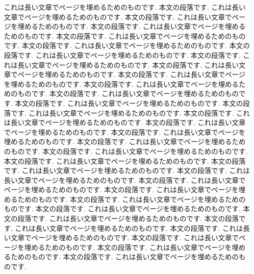\documentclass{jlreq}
\begin{document}
これは長い文章でページを埋めるためのものです. 本文の段落です. これは長い文章でページを埋めるためのものです. 本文の段落です. これは長い文章でページを埋めるためのものです. 本文の段落です. これは長い文章でページを埋めるためのものです. 本文の段落です. これは長い文章でページを埋めるためのものです. 本文の段落です. これは長い文章でページを埋めるためのものです. 本文の段落です. これは長い文章でページを埋めるためのものです. 本文の段落です. これは長い文章でページを埋めるためのものです. 本文の段落です. これは長い文章でページを埋めるためのものです. 本文の段落です. これは長い文章でページを埋めるためのものです. 本文の段落です. これは長い文章でページを埋めるためのものです. 本文の段落です. これは長い文章でページを埋めるためのものです. 本文の段落です. これは長い文章でページを埋めるためのものです. 本文の段落です. これは長い文章でページを埋めるためのものです. 本文の段落です. これは長い文章でページを埋めるためのものです. 本文の段落です. これは長い文章でページを埋めるためのものです. 本文の段落です. これは長い文章でページを埋めるためのものです. 本文の段落です. これは長い文章でページを埋めるためのものです. 本文の段落です. これは長い文章でページを埋めるためのものです. 本文の段落です. これは長い文章でページを埋めるためのものです. 本文の段落です. これは長い文章でページを埋めるためのものです. 本文の段落です. これは長い文章でページを埋めるためのものです. 本文の段落です. これは長い文章でページを埋めるためのものです. 本文の段落です. これは長い文章でページを埋めるためのものです. 本文の段落です. これは長い文章でページを埋めるためのものです. 本文の段落です. これは長い文章でページを埋めるためのものです. 本文の段落です. これは長い文章でページを埋めるためのものです. 本文の段落です. これは長い文章でページを埋めるためのものです. 本文の段落です. これは長い文章でページを埋めるためのものです. 本文の段落です. これは長い文章でページを埋めるためのものです. 本文の段落です. これは長い文章でページを埋めるためのものです. 本文の段落です. これは長い文章でページを埋めるためのものです. 
\end{document}
